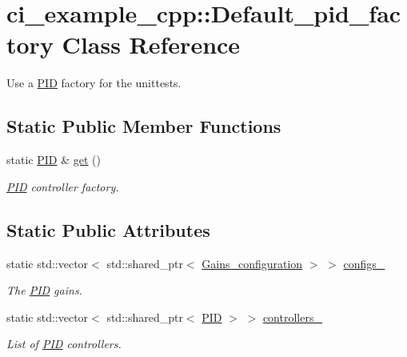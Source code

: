 \hypertarget{classci__example__cpp_1_1Default__pid__factory}{}\section{ci\+\_\+example\+\_\+cpp\+:\+:Default\+\_\+pid\+\_\+factory Class Reference}
\label{classci__example__cpp_1_1Default__pid__factory}


Use a \hyperlink{classci__example__cpp_1_1PID}{P\+ID} factory for the unittests.  


\subsection*{Static Public Member Functions}
\begin{DoxyCompactItemize}
\item 
static \hyperlink{classci__example__cpp_1_1PID}{P\+ID} \& \hyperlink{classci__example__cpp_1_1Default__pid__factory_a5dbbcfbe3e19953b9d0c490ea62fde1a}{get} ()
\begin{DoxyCompactList}\small\item\em \hyperlink{classci__example__cpp_1_1PID}{P\+ID} controller factory. \end{DoxyCompactList}\end{DoxyCompactItemize}
\subsection*{Static Public Attributes}
\begin{DoxyCompactItemize}
\item 
static std\+::vector$<$ std\+::shared\+\_\+ptr$<$ \hyperlink{classci__example__cpp_1_1Gains__configuration}{Gains\+\_\+configuration} $>$ $>$ \hyperlink{classci__example__cpp_1_1Default__pid__factory_aea273f7df00844476e72b7e6951a493e}{configs\+\_\+}
\begin{DoxyCompactList}\small\item\em The \hyperlink{classci__example__cpp_1_1PID}{P\+ID} gains. \end{DoxyCompactList}\item 
static std\+::vector$<$ std\+::shared\+\_\+ptr$<$ \hyperlink{classci__example__cpp_1_1PID}{P\+ID} $>$ $>$ \hyperlink{classci__example__cpp_1_1Default__pid__factory_a39274f87a4700b707ba983d54db2df76}{controllers\+\_\+}
\begin{DoxyCompactList}\small\item\em List of \hyperlink{classci__example__cpp_1_1PID}{P\+ID} controllers. \end{DoxyCompactList}\end{DoxyCompactItemize}


